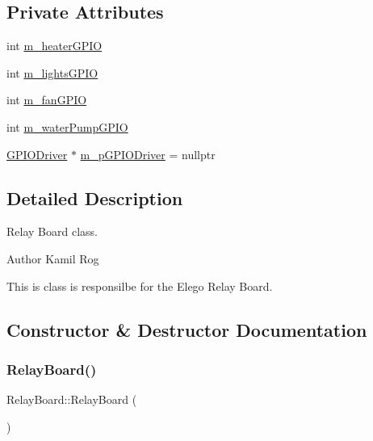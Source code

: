 \subsection*{Private Attributes}
\begin{DoxyCompactItemize}
\item 
int \hyperlink{classRelayBoard_a56817d4c93db75ccb542f8ee403d8440}{m\+\_\+heater\+G\+P\+IO}
\item 
int \hyperlink{classRelayBoard_aa781c5647863245c5ae7afbf6e185e59}{m\+\_\+lights\+G\+P\+IO}
\item 
int \hyperlink{classRelayBoard_af541df432f4ef6b385ee2e69c466b344}{m\+\_\+fan\+G\+P\+IO}
\item 
int \hyperlink{classRelayBoard_a45807effbe5aaf2798d4f91dcf3c42d8}{m\+\_\+water\+Pump\+G\+P\+IO}
\item 
\hyperlink{classGPIODriver}{G\+P\+I\+O\+Driver} $\ast$ \hyperlink{classRelayBoard_ab567d2b303df89856d0e1e599aa538bc}{m\+\_\+p\+G\+P\+I\+O\+Driver} = nullptr
\end{DoxyCompactItemize}


\subsection{Detailed Description}
Relay Board class. 

\begin{DoxyAuthor}{Author}
Kamil Rog
\end{DoxyAuthor}
This is class is responsilbe for the Elego Relay Board. 

\subsection{Constructor \& Destructor Documentation}
\mbox{\label{classRelayBoard_ad96963754490cea54db92cf32ccccf90}} 
\subsubsection{\texorpdfstring{Relay\+Board()}{RelayBoard()}}
{\footnotesize\ttfamily Relay\+Board\+::\+Relay\+Board (\begin{DoxyParamCaption}{ }\end{DoxyParamCaption})\hspace{0.3cm}{\ttfamily [inline]}}

